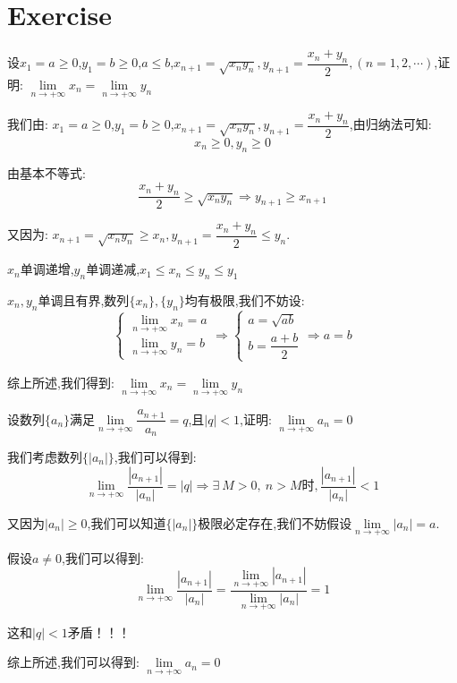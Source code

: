 \section{Exercise}
\begin{proposition}
	设$x_{1}=a\geq 0$,$y_{1}=b\geq 0$,$a\leq b$,$x_{n+1}=\sqrt{x_{n}y_{n}},y_{n+1}=\dfrac{x_{n}+y_{n}}{2},(n=1,2,\cdots)$,证明:  $\lim\limits_{n\rightarrow +\infty}x_{n}=\lim\limits_{n\rightarrow +\infty}y_{n}$
\end{proposition}
\begin{solution}
	
	我们由:  $x_{1}=a\geq 0$,$y_{1}=b\geq 0$,$x_{n+1}=\sqrt{x_{n}y_{n}},y_{n+1}=\dfrac{x_{n}+y_{n}}{2}$,由归纳法可知:  
	$$x_{n}\geq 0, y_{n}\geq 0$$
	
	由基本不等式:  
	$$\dfrac{x_{n}+y_{n}}{2}\geq \sqrt{x_{n}y_{n}}\Rightarrow y_{n+1}\geq x_{n+1}$$
	
	又因为:  $x_{n+1}=\sqrt{x_{n}y_{n}}\geq x_{n}, y_{n+1}=\dfrac{x_{n}+y_{n}}{2}\leq y_{n}$.
	
	$x_{n}$单调递增,$y_{n}$单调递减,$x_{1}\leq x_{n}\leq y_{n}\leq y_{1}$
	
	$x_{n},y_{n}$单调且有界,数列$\{x_{n}\},\{y_{n}\}$均有极限,我们不妨设:  
	$$\left\lbrace
	\begin{array}{l}
		\lim\limits_{n\rightarrow +\infty}x_{n}=a\\
		\lim\limits_{n\rightarrow +\infty}y_{n}=b
	\end{array}
	\right. \Rightarrow \left\lbrace
	\begin{array}{l}
		a=\sqrt{ab}\\
		b=\dfrac{a+b}{2}
	\end{array}
	\right. \Rightarrow a=b$$
	
	综上所述,我们得到:  $\lim\limits_{n\rightarrow +\infty}x_{n}=\lim\limits_{n\rightarrow +\infty}y_{n}$
\end{solution}

\begin{proposition}
	设数列$\{a_{n}\}$满足$\lim\limits_{n\rightarrow+\infty}\dfrac{a_{n+1}}{a_{n}}=q$,且$|q|<1$,证明:  $\lim\limits_{n\rightarrow+\infty}a_{n}=0$
\end{proposition}
\begin{solution}
	
	我们考虑数列$\{|a_{n}|\}$,我们可以得到:  
	$$\lim\limits_{n\rightarrow +\infty}\dfrac{|a_{n+1}|}{|a_{n}|}=|q|\Rightarrow \exists\ M>0,\ n>M\text{时}, \dfrac{|a_{n+1}|}{|a_{n}|}<1$$
	
	又因为$|a_{n}|\geq 0$,我们可以知道$\{|a_{n}|\}$极限必定存在,我们不妨假设$\lim\limits_{n\rightarrow+\infty}|a_{n}|=a$.
	
	假设$a\neq 0$,我们可以得到:  $$\lim\limits_{n\rightarrow  +\infty}\dfrac{|a_{n+1}|}{|a_{n}|}=\dfrac{\lim\limits_{n\rightarrow  +\infty}|a_{n+1}|}{\lim\limits_{n\rightarrow  +\infty}|a_{n}|}=1$$
	
	这和$|q|<1$矛盾！！！
	
	
	综上所述,我们可以得到:  $\lim\limits_{n\rightarrow+\infty}a_{n}=0$
\end{solution}

